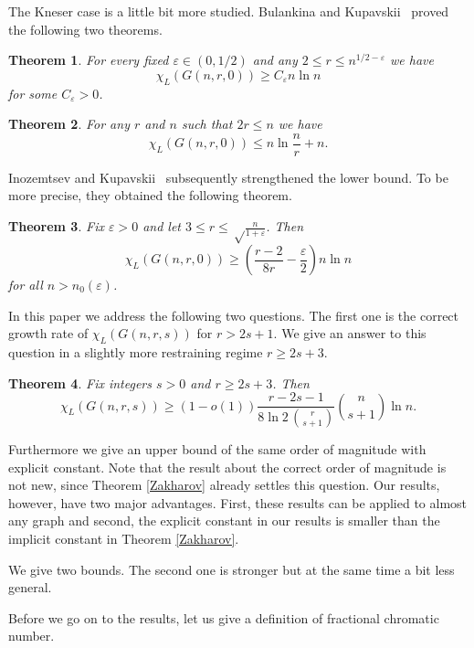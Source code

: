 \documentclass[12pt]{article}
\newtheorem{theorem}{Theorem}
\theoremstyle{remark}
\theoremstyle{definition}
\newcommand{\skob}[1]{\left(#1\right)}
\begin{document}
The Kneser case is a little bit more studied.
Bulankina and Kupavskii~\cite{BulKup} proved the following two theorems.

\begin{theorem}\label{Low1}
    For every fixed $\varepsilon\in(0,1/2)$ and any $2 \leq r \leq n^{1/2-\varepsilon}$ we have
    $$
        \chi_L(G(n,r,0)) \geq C_{\varepsilon}n\ln n
    $$
    for some $C_\varepsilon > 0$.
\end{theorem}

\begin{theorem}\label{Up}
    For any $r$ and $n$ such that $2r \leq n$ we have
    $$
        \chi_L(G(n,r,0))\le n\ln\frac{n}{r}+n.
    $$
\end{theorem}

Inozemtsev and Kupavskii~\cite{InKup} subsequently strengthened the lower bound. To be more precise, they obtained the following theorem.

\begin{theorem}\label{Low2}
    Fix $\varepsilon > 0$ and let $3 \leq r \leq \sqrt\frac{n}{1+\varepsilon}$. Then
    $$
    \chi_L(G(n,r,0)) \geq \skob{\frac{r-2}{8r}-\frac{\varepsilon}{2}}n\ln n
    $$
    for all $n > n_0(\varepsilon)$.
\end{theorem}

In this paper we address the following two questions. The first one is the correct growth rate of $\chi_L(G(n,r,s))$ for $r > 2s+1$. We give an answer to this question in a slightly more restraining regime $r \geq 2s+3$. 

\begin{theorem}
    \label{main_gnrs}
    Fix integers $s > 0$ and $r \geq 2s+3$. Then
    $$
        \chi_L(G(n,r,s)) \geq (1-o(1))\frac{r-2s-1}{8\ln 2\, \binom{r}{s+1}}\binom{n}{s+1}\ln n.
    $$
\end{theorem}

Furthermore we give an upper bound of the same order of magnitude with explicit constant. Note that the result about the correct order of magnitude is not new, since Theorem \ref{Zakharov} already settles this question. Our results, however, have two major advantages. First, these results can be applied to almost any graph and second, the explicit constant in our results is smaller than the implicit constant in Theorem \ref{Zakharov}.

We give two bounds. The second one is stronger but at the same time a bit less general.

Before we go on to the results, let us give a definition of fractional chromatic number.
\end{document}
